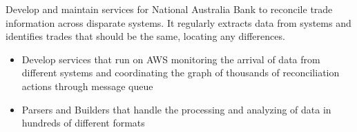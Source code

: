 \documentclass{resume}
\begin{document}
\begin{flushleft}
Develop and maintain services for National Australia Bank to reconcile trade information across disparate systems. It regularly extracts data from systems and identifies trades that should be the same, locating any differences.
\begin{itemize}
  \item Develop services that run on AWS monitoring the arrival of data from different systems and coordinating the graph of thousands of reconciliation actions through message queue
  \item Parsers and Builders that handle the processing and analyzing of data in hundreds of different formats
\end{itemize}
\end{flushleft}
\end{document}
